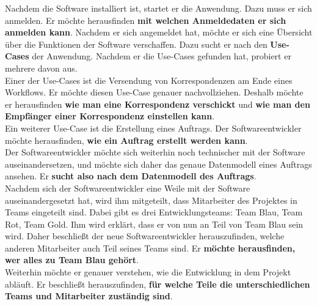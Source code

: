 Nachdem die Software installiert ist, startet er die Anwendung.
Dazu muss er sich anmelden.
Er möchte herausfinden \textbf{mit welchen Anmeldedaten er sich anmelden kann}.
Nachdem er sich angemeldet hat, möchte er sich eine Übersicht über die Funktionen der Software verschaffen.
Dazu sucht er nach den \textbf{Use-Cases} der Anwendung.
Nachdem er die Use-Cases gefunden hat, probiert er mehrere davon aus.\\

Einer der Use-Cases ist die Versendung von Korrespondenzen am Ende eines Workflows.
Er möchte diesen Use-Case genauer nachvollziehen.
Deshalb möchte er herausfinden \textbf{wie man eine Korrespondenz verschickt} und \textbf{wie man den Empfänger einer Korrespondenz einstellen kann}.\\

Ein weiterer Use-Case ist die Erstellung eines Auftrags.
Der Softwareentwickler möchte herausfinden, \textbf{wie ein Auftrag erstellt werden kann}.\\

Der Softwareentwickler möchte sich weiterhin noch technischer mit der Software auseinandersetzen, und möchte sich daher das genaue Datenmodell eines Auftrags ansehen.
Er \textbf{sucht also nach dem Datenmodell des Auftrags}.\\

Nachdem sich der Softwareentwickler eine Weile mit der Software auseinandergesetzt hat, wird ihm mitgeteilt, dass Mitarbeiter des Projektes in Teams eingeteilt sind.
Dabei gibt es drei Entwicklungsteams: Team Blau, Team Rot, Team Gold.
Ihm wird erklärt, dass er von nun an Teil von Team Blau sein wird.
Daher beschließt der neue Softwareentwickler herauszufinden, welche anderen Mitarbeiter auch Teil seines Teams sind.
Er \textbf{möchte herausfinden, wer alles zu Team Blau gehört}.\\

Weiterhin möchte er genauer verstehen, wie die Entwicklung in dem Projekt abläuft.
Er beschließt herauszufinden, \textbf{für welche Teile die unterschiedlichen Teams und Mitarbeiter zuständig sind}.

